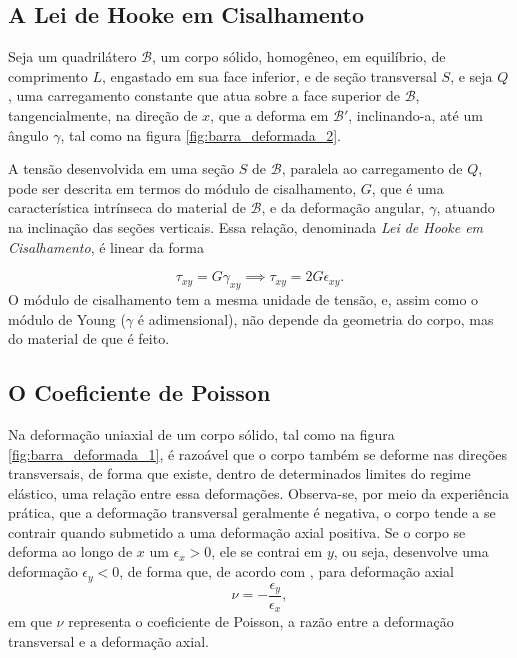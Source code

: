 \subsection{A Lei de Hooke em Cisalhamento}

Seja um quadrilátero $\mathcal{B}$, um corpo sólido, homogêneo, em equilíbrio, de comprimento $L$, engastado em sua face inferior, e de seção transversal $S$, e seja $Q$, uma carregamento constante que atua sobre a face superior de $\mathcal{B}$, tangencialmente, na direção de $x$, que a deforma em $\mathcal{B}'$, inclinando-a, até um ângulo $\gamma$, tal como na figura \ref{fig:barra_deformada_2}. 

A tensão desenvolvida em uma seção $S$ de $\mathcal{B}$, paralela ao carregamento de  $Q$, pode ser descrita em termos do módulo de cisalhamento, $G$, que é uma característica intrínseca do material de $\mathcal{B}$, e da deformação angular, $\gamma$, atuando na inclinação das seções verticais. Essa relação, denominada \emph{Lei de Hooke em Cisalhamento}, é linear da forma

\begin{equation}
    \tau_{xy} = G \gamma_{xy} \implies \tau_{xy} = 2G \epsilon_{xy}.
    \label{eq:lei_de_hooke_cisalhamento}
\end{equation}
O módulo de cisalhamento tem a mesma unidade de tensão, e, assim como o módulo de Young ($\gamma$ é adimensional), não depende da geometria do corpo, mas do material de que é feito.

\subsection{O Coeficiente de Poisson}

Na deformação uniaxial de um corpo sólido, tal como na figura \ref{fig:barra_deformada_1}, é razoável que o corpo também se deforme nas direções transversais, de forma que existe, dentro de determinados limites do regime elástico, uma relação entre essa deformações. Observa-se, por meio da experiência prática, que a deformação transversal geralmente é negativa, o corpo tende a se contrair quando submetido a uma deformação axial positiva. Se o corpo se deforma ao longo de $x$ um $\epsilon_x > 0$, ele se contrai em $y$, ou seja, desenvolve uma deformação $\epsilon_y < 0$, de forma que, de acordo com , para deformação axial
\begin{equation}
    \nu = -\frac{\epsilon_y}{\epsilon_x},
    \label{eq:coeficiente_de_poisson}
\end{equation}
em que $\nu$ representa o coeficiente de Poisson, a razão entre a deformação transversal e a deformação axial.

